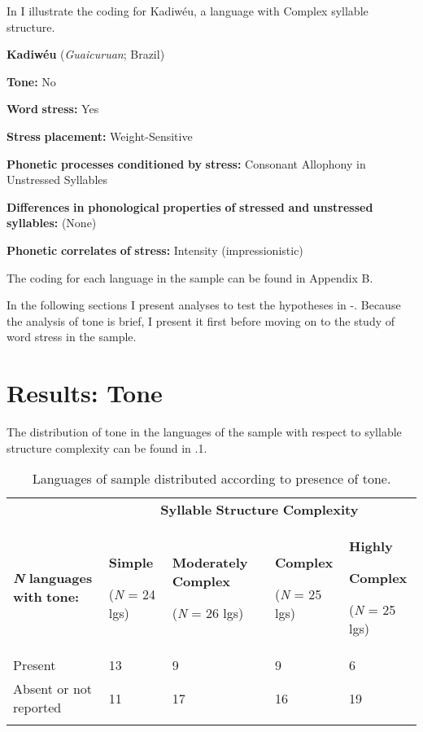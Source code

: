   In  I illustrate the coding for Kadiwéu, a language with Complex syllable structure.

\ea\label{ex:(5.26)}
  \textbf{Kadiwéu} (\textit{Guaicuruan}; Brazil)

\textbf{Tone:} No

\textbf{Word} \textbf{stress:} Yes

\textbf{Stress} \textbf{placement:} Weight-Sensitive

\textbf{Phonetic} \textbf{processes} \textbf{conditioned} \textbf{by} \textbf{stress:} Consonant Allophony in Unstressed Syllables

\textbf{Differences} \textbf{in} \textbf{phonological} \textbf{properties} \textbf{of} \textbf{stressed} \textbf{and} \textbf{unstressed} \textbf{syllables:} (None)

\textbf{Phonetic} \textbf{correlates} \textbf{of} \textbf{stress:} Intensity (impressionistic)

\z

The coding for each language in the sample can be found in Appendix B.

  In the following sections I present analyses to test the hypotheses in -. Because the analysis of tone is brief, I present it first before moving on to the study of word stress in the sample.

\section{Results: Tone}\label{sec:5.3}

  The distribution of tone in the languages of the sample with respect to syllable structure complexity can be found in .1.

\begin{table}
\begin{tabularx}{\textwidth}{XXXXX}
\lsptoprule
 & \multicolumn{4}{c}{ \textbf{Syllable} \textbf{Structure} \textbf{Complexity}}\\
 \textbf{\textit{N}} \textbf{languages} \textbf{with} \textbf{tone:} & { \textbf{Simple}}

 (\textit{N} = 24 lgs) & { \textbf{Moderately} \textbf{Complex}}

 (\textit{N} = 26 lgs) & { \textbf{Complex}}

 (\textit{N} = 25 lgs) & { \textbf{Highly} }

{ \textbf{Complex}}

 (\textit{N} = 25 lgs)\\
 Present & 13 & 9 & 9 & 6\\
 Absent or not reported & 11 & 17 & 16 & 19\\
\lspbottomrule
\end{tabularx}
\caption{\label{5.1}Languages of sample distributed according to presence of tone.}
\end{table}

